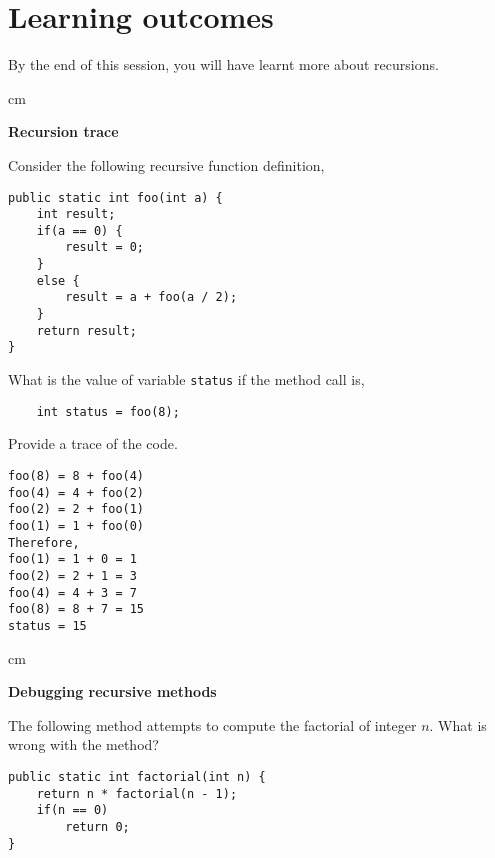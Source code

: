 
\section* {Learning outcomes}

By the end of this session, you will have learnt more about recursions. 


\begin{questions}

 cm 

\question  \textbf{Recursion trace} \vskip 0.5cm

Consider the following recursive function definition,

\begin{lstlisting}
public static int foo(int a) {
	int result;
	if(a == 0) {
		result = 0;
	}
	else {
 		result = a + foo(a / 2);
	}
	return result;
}
\end{lstlisting}

What is the value of variable \texttt{status} if the method call is,

\begin{lstlisting}
	int status = foo(8);
\end{lstlisting}

Provide a trace of the code.

\begin{solution}
\begin{verbatim}
foo(8) = 8 + foo(4)
foo(4) = 4 + foo(2)
foo(2) = 2 + foo(1)
foo(1) = 1 + foo(0)
Therefore,
foo(1) = 1 + 0 = 1
foo(2) = 2 + 1 = 3
foo(4) = 4 + 3 = 7
foo(8) = 8 + 7 = 15
status = 15
\end{verbatim}
\end{solution}

 cm 

\question  \textbf{Debugging recursive methods} \vskip 0.5cm

The following method attempts to compute the factorial of integer $n$. What is wrong with the method?

\begin{lstlisting}
public static int factorial(int n) {
	return n * factorial(n - 1);
	if(n == 0)
		return 0;
}
\end{lstlisting}


\end{questions}
